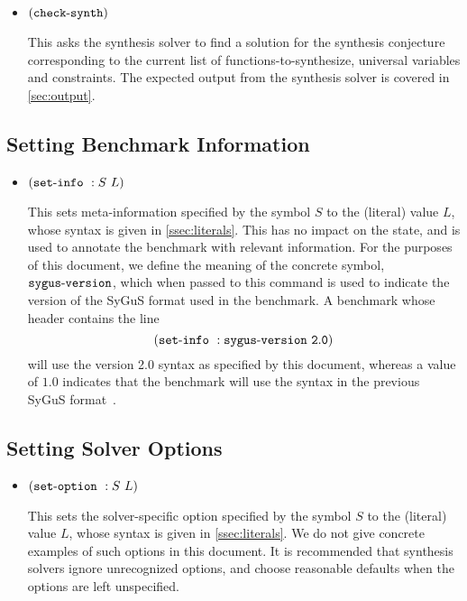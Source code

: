 \documentclass[english,a4paper,10pt]{article}
\begin{document}
\begin{itemize}
\item ${\tt (}{\tt check\mbox{-}synth}{\tt )}$

This asks the synthesis solver to find a solution for the synthesis conjecture
corresponding to the current list of functions-to-synthesize,
universal variables and constraints.
The expected output
from the synthesis solver is covered in \cref{sec:output}.
\end{itemize}

\subsection{Setting Benchmark Information}

\begin{itemize}
\item ${\tt (}{\tt set\mbox{-}info}\mbox{ }:S\mbox{ }L{\tt )}$

This sets meta-information specified by the symbol $S$
to the (literal) value $L$, whose syntax is given in \cref{ssec:literals}.
This has no impact on the state, and is used to annotate the
benchmark with relevant information.
For the purposes of this document, we define the meaning of
the concrete symbol, ${\tt sygus\mbox{-}version}$,
which when passed to this command is used to indicate the version of the SyGuS
format used in the benchmark.
A benchmark whose header contains the line
\[
{\tt (}{\tt set\mbox{-}info}\mbox{ }:{\tt sygus\mbox{-}version\mbox{ }2.0}{\tt )}
\]
will use the version 2.0 syntax as specified by this document,
whereas a value of $1.0$ indicates that the benchmark will use the
syntax in the previous SyGuS format~\cite{sygusFormat,sygusSyntax2015,sygusSyntax2016}.
\end{itemize}
\subsection{Setting Solver Options}

\begin{itemize}
\item ${\tt (}{\tt set\mbox{-}option}\mbox{ }:S\mbox{ }L{\tt )}$

This sets the solver-specific option specified by the symbol $S$ 
to the (literal) value $L$, whose syntax is given in \cref{ssec:literals}.
We do not give concrete examples of such options in this document. %
It is recommended that synthesis solvers
ignore unrecognized options, 
and choose reasonable defaults when the
options are left unspecified.
\end{itemize}
\end{document}
